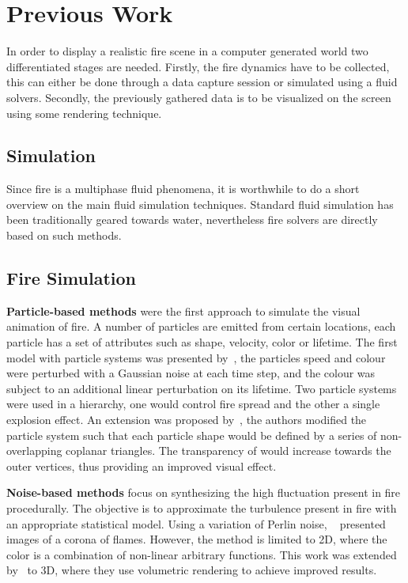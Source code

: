 \chapter{Previous Work}
\label{ch:previous_work}

In order to display a realistic fire scene in a computer generated world two differentiated stages are needed.
Firstly, the fire dynamics have to be collected, this can either be done through a data capture session or simulated using a fluid solvers.
Secondly, the previously gathered data is to be visualized on the screen using some rendering technique.

\section{Simulation}
\label{sec:simulation}

Since fire is a multiphase fluid phenomena, it is worthwhile to do a short overview on the main fluid simulation techniques.
Standard fluid simulation has been traditionally geared towards water, nevertheless fire solvers are directly based on such methods.

\section{Fire Simulation}
\label{sec:fire_simulation}

\textbf{Particle-based methods} were the first approach to simulate the visual animation of fire.
A number of particles are emitted from certain locations, each particle has a set of attributes such as shape, velocity, color or lifetime.
The first model with particle systems was presented by~\cite{Reeves:1983}, the particles speed and colour were perturbed with a Gaussian noise at each time step, and the colour was subject to an additional linear perturbation on its lifetime.
Two particle systems were used in a hierarchy, one would control fire spread and the other a single explosion effect.
An extension was proposed by~\cite{Perry:1994}, the authors modified the particle system such that each particle shape would be defined by a series of non-overlapping coplanar triangles.
The transparency of would increase towards the outer vertices, thus providing an improved visual effect.


\textbf{Noise-based methods} focus on synthesizing the high fluctuation present in fire procedurally.
The objective is to approximate the turbulence present in fire with an appropriate statistical model.
Using a variation of Perlin noise, ~\cite{Perlin:1985} presented images of a corona of flames.
However, the method is limited to 2D, where the color is a combination of non-linear arbitrary functions.
This work was extended by~\cite{Perlin:1989} to 3D, where they use volumetric rendering to achieve improved results.


